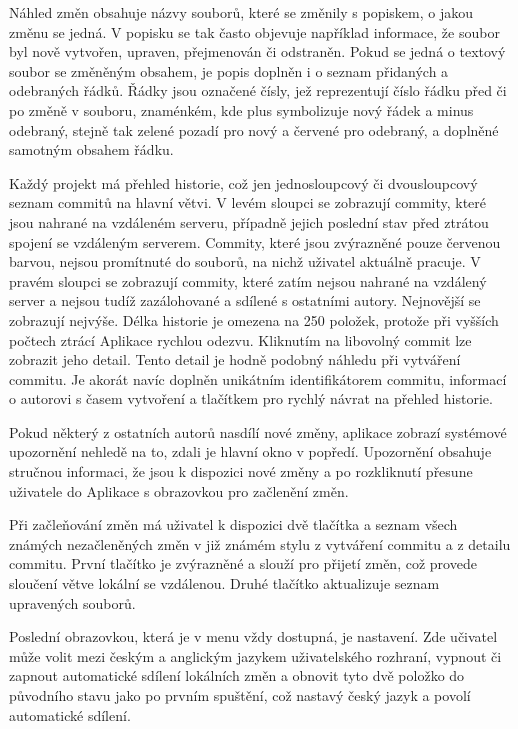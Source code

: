 Náhled změn obsahuje názvy souborů, které se změnily s popiskem, o jakou změnu se jedná. V popisku se tak často objevuje například informace, že soubor byl nově vytvořen, upraven, přejmenován či odstraněn. Pokud se jedná o textový soubor se změněným obsahem, je popis doplněn i o seznam přidaných a odebraných řádků. Řádky jsou označené čísly, jež reprezentují číslo řádku před či po změně v souboru, znaménkém, kde plus symbolizuje nový řádek a minus odebraný, stejně tak zelené pozadí pro nový a červené pro odebraný, a doplněné samotným obsahem řádku.

Každý projekt má přehled historie, což jen jednosloupcový či dvousloupcový seznam commitů na hlavní větvi. V levém sloupci se zobrazují commity, které jsou nahrané na vzdáleném serveru, případně jejich poslední stav před ztrátou spojení se vzdáleným serverem. Commity, které jsou zvýrazněné pouze červenou barvou, nejsou promítnuté do souborů, na nichž uživatel aktuálně pracuje. V pravém sloupci se zobrazují commity, které zatím nejsou nahrané na vzdálený server a nejsou tudíž zazálohované a sdílené s ostatními autory. Nejnovější se zobrazují nejvýše. Délka historie je omezena na 250 položek, protože při vyšších počtech ztrácí Aplikace rychlou odezvu. Kliknutím na libovolný commit lze zobrazit jeho detail. Tento detail je hodně podobný náhledu při vytváření commitu. Je akorát navíc doplněn unikátním identifikátorem commitu, informací o autorovi s časem vytvoření a tlačítkem pro rychlý návrat na přehled historie.

Pokud některý z ostatních autorů nasdílí nové změny, aplikace zobrazí systémové upozornění nehledě na to, zdali je hlavní okno v popředí. Upozornění obsahuje stručnou informaci, že jsou k dispozici nové změny a po rozkliknutí přesune uživatele do Aplikace s obrazovkou pro začlenění změn.

Při začleňování změn má uživatel k dispozici dvě tlačítka a seznam všech známých nezačleněných změn v již známém stylu z vytváření commitu a z detailu commitu. První tlačítko je zvýrazněné a slouží pro přijetí změn, což provede sloučení větve lokální se vzdálenou. Druhé tlačítko aktualizuje seznam upravených souborů.

Poslední obrazovkou, která je v menu vždy dostupná, je nastavení. Zde učivatel může volit mezi českým a anglickým jazykem uživatelského rozhraní, vypnout či zapnout automatické sdílení lokálních změn a obnovit tyto dvě položko do původního stavu jako po prvním spuštění, což nastavý český jazyk a povolí automatické sdílení.
